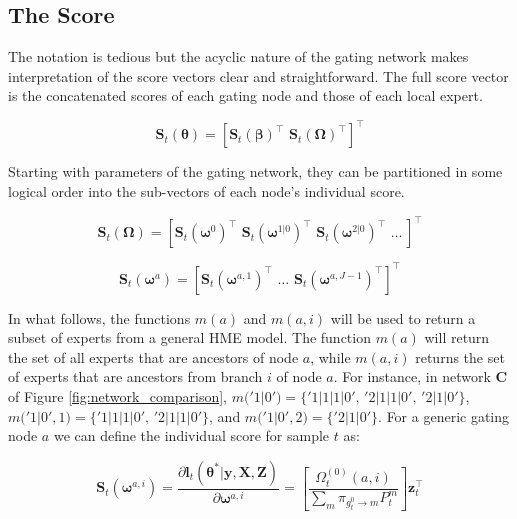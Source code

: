 \documentclass[12pt]{article}
\newcommand{\bw}[1]{\boldsymbol{\omega}^{#1}}
\newcommand{\gateprod}[2]{\pi_{#1 \longrightarrow #2}}
\newcommand{\FnOmegaNaught}[2]{\Omega^{(0)}_{t}( #1, #2 )}
\begin{document}
\subsection{The Score} \label{sec:TheScore}

The notation is tedious but the acyclic nature of the
gating network makes interpretation of the score vectors clear and
straightforward. The full score vector is the concatenated scores  
of each gating node and those of each local expert.

\begin{equation}
  \boldsymbol{S}_{t}(\boldsymbol{\theta}) = [ \boldsymbol{S}_{t}(\boldsymbol{\beta})^{\top} \,\, \boldsymbol{S}_{t}(\boldsymbol{\Omega})^{\top} ]^{\top}
\end{equation}

Starting with
parameters of the gating network, they can be partitioned 
in some logical order into the sub-vectors of each node's individual
score.

\begin{equation}
  \boldsymbol{S}_{t}(\boldsymbol{\Omega}) = [ \boldsymbol{S}_{t}(\boldsymbol{\omega}^{0})^{\top} \,\, \boldsymbol{S}_{t}(\boldsymbol{\omega}^{1 | 0})^{\top} \,\, \boldsymbol{S}_{t}(\boldsymbol{\omega}^{2 | 0})^{\top} \,\, \ldots \, ]^{\top}
\end{equation}

\begin{equation}
  \boldsymbol{S}_{t}(\boldsymbol{\omega}^{a}) = [ \boldsymbol{S}_{t}(\bw{a, 1})^{\top} \,\, \ldots \,\, \boldsymbol{S}_{t}(\bw{a, J - 1})^{\top} ]^{\top}
\end{equation}

In what follows, the functions $m(a)$ and $m(a, i)$ will be used to return
a subset of experts from a general HME model. The function $m(a)$ will
return the set of all experts that are ancestors of node $a$, while
$m(a, i)$ returns the set of experts that are ancestors from branch
$i$ of node $a$. For instance, in network $\boldsymbol{C}$ of Figure
\ref{fig:network_comparison}, $m('1|0') = \{'1|1|1|0', \, '2|1|1|0', \, '2|1|0'\}$,
$m('1|0', 1) = \{'1|1|1|0', \, '2|1|1|0'\}$, and $m('1|0', 2) = \{'2|1|0'\}$.
For a generic gating node $a$ we can define the individual score for 
sample $t$ as:

\begin{equation} \label{eq:gateScore}
  \boldsymbol{S}_{t}(\bw{a, i}) = \frac{\partial \boldsymbol{l}_{t}(\boldsymbol{\theta}^{*}| \boldsymbol{y}, \boldsymbol{X}, \boldsymbol{Z}) }{\partial \boldsymbol{\omega}^{a,i}} = \left[ \frac{ \FnOmegaNaught{a}{i} }{ \sum_{m} \gateprod{g^{0}_{t}}{m} P^{m}_{t} } \right] \boldsymbol{z}_{t}^{\top} 
\end{equation}
\end{document}
